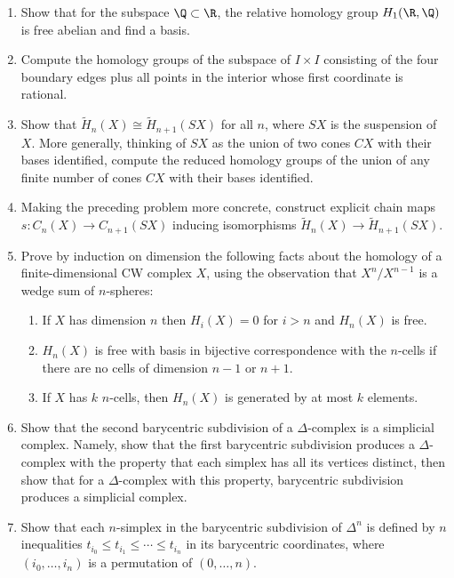 \begin{enumerate}
\item Show that for the subspace $\Q \subset \R$, the relative homology group $H_1(\R, \Q)$ is free
abelian and find a basis.

\item Compute the homology groups of the subspace of $I \times I$ consisting of the four
boundary edges plus all points in the interior whose first coordinate is rational.

\item Show that $\tilde H_n(X) \cong \tilde H_{n+1}(SX)$ for all $n$, where $SX$ is the suspension of $X$. More
generally, thinking of $SX$ as the union of two cones $CX$ with their bases identified,
compute the reduced homology groups of the union of any finite number of cones
$CX$ with their bases identified.

\item Making the preceding problem more concrete, construct explicit chain maps
$s: C_n(X) \to C_{n+1}(SX)$ inducing isomorphisms $\tilde H_n(X) \to \tilde H_{n+1}(SX)$.

\item Prove by induction on dimension the following facts about the homology of a
finite-dimensional CW complex $X$, using the observation that $X^n/X^{n-1}$ is a wedge
sum of $n$-spheres:
\begin{enumerate}
\item[(a)] If $X$ has dimension $n$ then $H_i(X) = 0$ for $i > n$ and $H_n(X)$ is free.
\item[(b)] $H_n(X)$ is free with basis in bijective correspondence with the $n$-cells if there are
no cells of dimension $n - 1$ or $n + 1$.
\item[(c)] If $X$ has $k$ $n$-cells, then $H_n(X)$ is generated by at most $k$ elements.
\end{enumerate}

\item Show that the second barycentric subdivision of a $\Delta$-complex is a simplicial
complex. Namely, show that the first barycentric subdivision produces a $\Delta$-complex
with the property that each simplex has all its vertices distinct, then show that for a
$\Delta$-complex with this property, barycentric subdivision produces a simplicial complex.

\item Show that each $n$-simplex in the barycentric subdivision of $\Delta^n$ is defined by $n$
inequalities $t_{i_0} \le t_{i_1} \le \cdots \le t_{i_n}$ in its barycentric coordinates, where $(i_0, \ldots, i_n)$ is a
permutation of $(0, \ldots, n)$.


\end{enumerate}
